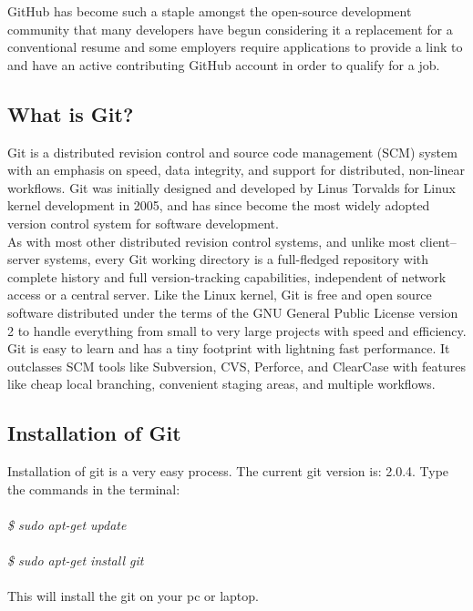\noindent GitHub has become such a staple amongst the open-source development community that many developers have begun considering it a replacement for a conventional resume and some employers require applications to provide a link to and have an active contributing GitHub account in order to qualify for a job.

\subsection{What is Git?}
\noindent Git is a distributed revision control and source code management (SCM) system with an emphasis on speed, data integrity, and support for distributed, non-linear workflows. Git was initially designed and developed by Linus Torvalds for Linux kernel development in 2005, and has since become the most widely adopted version control system for software development.\\

\noindent As with most other distributed revision control systems, and unlike most client–server systems, every Git working directory is a full-fledged repository with complete history and full version-tracking capabilities, independent of network access or a central server. Like the Linux kernel, Git is free and open source software distributed under the terms of the GNU General Public License version 2 to handle everything from small to very large projects with speed and efficiency.\\

\noindent Git is easy to learn and has a tiny footprint with lightning fast performance. It outclasses SCM tools like Subversion, CVS, Perforce, and ClearCase with features like cheap local branching, convenient staging areas, and multiple workflows.

\subsection{Installation of Git}

Installation of git is a very easy process.
The current git version is: 2.0.4.
Type the commands in the terminal:\\\\
\emph{
\$ sudo apt-get update\\\\
\$ sudo apt-get install git\\\\}
This will install the git on your pc or laptop.

